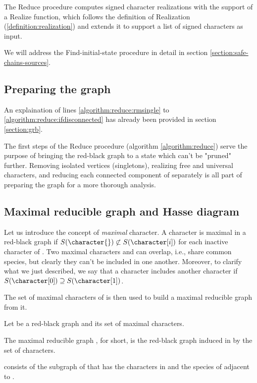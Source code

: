 The Reduce procedure computes signed character realizations with the support of a Realize function, which follows the definition of Realization (\ref{definition:realization}) and extends it to support a list of signed characters as input.

We will address the Find-initial-state procedure in detail in section \ref{section:safe-chains-sources}.

\subsection{Preparing the graph}\label{section:preparing-the-graph}

An explaination of lines \ref{algorithm:reduce:rmsingle} to \ref{algorithm:reduce:ifdisconnected} has already been provided in section \ref{section:grb}.

The first steps of the Reduce procedure (algorithm \ref{algorithm:reduce}) serve the purpose of bringing the red-black graph to a state which can't be "pruned" further.
Removing isolated vertices (singletons), realizing free and universal characters, and reducing each connected component of \grb{} separately is all part of preparing the graph for a more thorough analysis.

\subsection{Maximal reducible graph and Hasse diagram}\label{section:gm-hassediagram}

Let us introduce the concept of \emph{maximal} character.
A character \character{} is maximal in a red-black graph \grb{} if $S(\character{}) \not\subset S(\character[i])$ for each inactive character \character[i] of \grb{}.
Two maximal characters \character[0] and \character[1] can overlap, i.e., share common species, but clearly they can't be included in one another.
Moreover, to clarify what we just described, we say that a character \character[0] includes another character \character[1] if $S(\character[0]) \supseteq S(\character[1])$.

The set of maximal characters of \grb{} is then used to build a maximal reducible graph \grbcm{} from it.

\begin{definition}\label{definition:maximal-reducible-graph}
  Let \grb{} be a red-black graph and \cm{} its set of maximal characters.

  The maximal reducible graph \grbcm{}, \gm{} for short, is the red-black graph induced in \grb{} by the set \cm{} of characters.

  \gm{} consists of the subgraph of \grb{} that has the characters in \cm{} and the species of \grb{} adjacent to \cm{}.
\end{definition}

